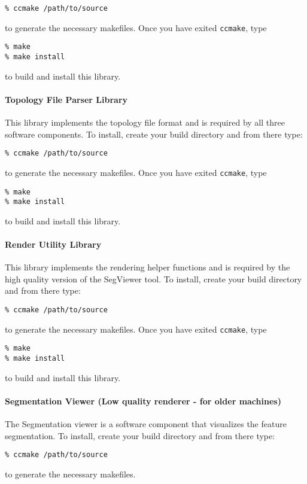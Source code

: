 \texttt{\% ccmake /path/to/source}

to generate the necessary makefiles. Once you have exited \texttt{ccmake}, type 

\texttt{\% make}\\
\texttt{\% make install}

to build and install this library.


\paragraph{Topology File Parser Library} 
This library implements the topology file format and is required by all three software 
components.  To install, create your build directory and from there type:

\texttt{\% ccmake /path/to/source}

to generate the necessary makefiles. Once you have exited \texttt{ccmake}, type 

\texttt{\% make}\\
\texttt{\% make install}

to build and install this library.

\paragraph{Render Utility Library} 
This library implements the rendering helper functions and is required by the high quality version of the SegViewer tool.
To install, create your build directory and from there type:

\texttt{\% ccmake /path/to/source}

to generate the necessary makefiles. Once you have exited \texttt{ccmake}, type 

\texttt{\% make}\\
\texttt{\% make install}

to build and install this library.

\paragraph{Segmentation Viewer (Low quality renderer - for older machines)} 
The Segmentation viewer is a software component that visualizes the feature segmentation.
To install, create your build directory and from there type:

\texttt{\% ccmake /path/to/source}

to generate the necessary makefiles. 


